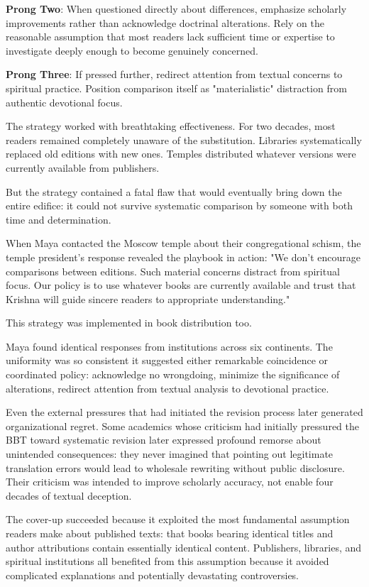 \documentclass[12pt,twoside]{book}
\begin{document}
\textbf{\textbf{Prong Two}}: When questioned directly about differences, emphasize scholarly improvements rather than acknowledge doctrinal alterations. Rely on the reasonable assumption that most readers lack sufficient time or expertise to investigate deeply enough to become genuinely concerned.

\textbf{\textbf{Prong Three}}: If pressed further, redirect attention from textual concerns to spiritual practice. Position comparison itself as "materialistic" distraction from authentic devotional focus.

The strategy worked with breathtaking effectiveness. For two decades, most readers remained completely unaware of the substitution. Libraries systematically replaced old editions with new ones. Temples distributed whatever versions were currently available from publishers.

But the strategy contained a fatal flaw that would eventually bring down the entire edifice: it could not survive systematic comparison by someone with both time and determination.

When Maya contacted the Moscow temple about their congregational schism, the temple president's response revealed the playbook in action: "We don't encourage comparisons between editions. Such material concerns distract from spiritual focus. Our policy is to use whatever books are currently available and trust that Krishna will guide sincere readers to appropriate understanding."

This strategy was implemented in book distribution too.

Maya found identical responses from institutions across six continents. The uniformity was so consistent it suggested either remarkable coincidence or coordinated policy: acknowledge no wrongdoing, minimize the significance of alterations, redirect attention from textual analysis to devotional practice.

Even the external pressures that had initiated the revision process later generated organizational regret. Some academics whose criticism had initially pressured the BBT toward systematic revision later expressed profound remorse about unintended consequences: they never imagined that pointing out legitimate translation errors would lead to wholesale rewriting without public disclosure. Their criticism was intended to improve scholarly accuracy, not enable four decades of textual deception.

The cover-up succeeded because it exploited the most fundamental assumption readers make about published texts: that books bearing identical titles and author attributions contain essentially identical content. Publishers, libraries, and spiritual institutions all benefited from this assumption because it avoided complicated explanations and potentially devastating controversies.
\end{document}

